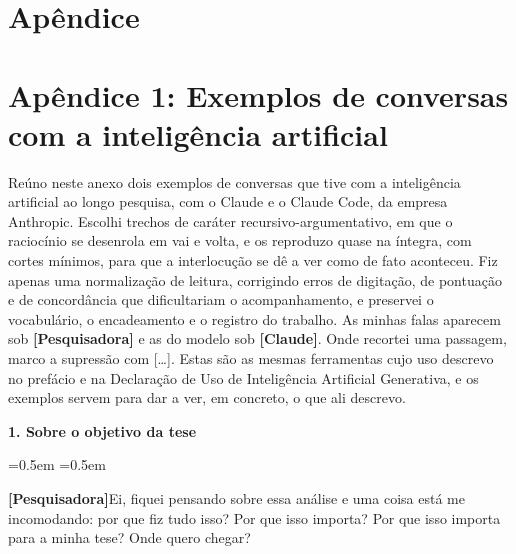 
 
\chapter*{Apêndice}
\thispagestyle{empty}

\chapter*{Apêndice 1: Exemplos de conversas com a inteligência artificial}

{\small %

Reúno neste anexo dois exemplos de conversas que tive com a inteligência artificial ao longo pesquisa, com o Claude e o Claude Code, da empresa Anthropic. Escolhi trechos de caráter recursivo-argumentativo, em que o raciocínio se desenrola em vai e volta, e os reproduzo quase na íntegra, com cortes mínimos, para que a interlocução se dê a ver como de fato aconteceu. Fiz apenas uma normalização de leitura, corrigindo erros de digitação, de pontuação e de concordância que dificultariam o acompanhamento, e preservei o vocabulário, o encadeamento e o registro do trabalho. As minhas falas aparecem sob \textbf{[Pesquisadora]} e as do modelo sob \textbf{[Claude]}. Onde recortei uma passagem, marco a supressão com [\ldots]. Estas são as mesmas ferramentas cujo uso descrevo no prefácio e na Declaração de Uso de Inteligência Artificial Generativa, e os exemplos servem para dar a ver, em concreto, o que ali descrevo.

\newenvironment{conversa}%
  {\par\medskip\footnotesize\setlength{\parskip}{2pt}\setlength{\parindent}{0pt}%
   \leftskip=0.5em \rightskip=0.5em}%
  {\par\medskip}
\newcommand{\pesq}[1]{\par\smallskip\noindent\textbf{[Pesquisadora]}\quad #1\par}
\newcommand{\claude}[1]{\par\smallskip\noindent\textbf{[Claude]}\quad{\ttfamily\small #1}\par}

\bigskip
\noindent\textbf{1. Sobre o objetivo da tese} 
\begin{conversa}
\pesq{Ei, fiquei pensando sobre essa análise e uma coisa está me incomodando: por que fiz tudo isso? Por que isso importa? Por que isso importa para a minha tese? Onde quero chegar?}


\end{conversa}}
